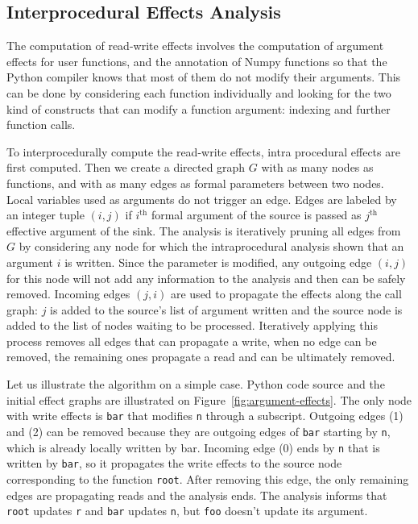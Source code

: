 \documentclass[10pt, preprint]{sigplanconf}
\begin{document}
\subsection{Interprocedural Effects Analysis}
\label{sec:effects}

The computation of read-write effects involves the computation of argument
effects for user functions, and the annotation of Numpy functions
so that the Python compiler knows that most of them do not modify their
arguments. This can be done by considering each function individually and
looking for the two kind of constructs that can modify a function argument:
indexing and further function calls.

To interprocedurally compute the read-write effects, intra procedural effects
are first computed. Then we create a directed graph $G$ with as many nodes as
functions, and with as many edges as formal parameters between two nodes. Local
variables used as arguments do not trigger an edge.
Edges are labeled by an integer tuple $(i, j)$ if $i^\text{th}$ formal
argument of the source is passed as $j^\text{th}$ effective argument of the
sink. The analysis is iteratively pruning all edges from $G$ by considering any
node for which the intraprocedural analysis shown that an argument $i$ is
written. Since the parameter is modified, any outgoing edge $(i, j)$ for this
node will not add any information to the analysis and then can be safely
removed. Incoming edges $(j, i)$ are used to propagate the effects along the
call graph: $j$ is added to the source's list of argument written and the source
node is added to the list of nodes waiting to be processed. Iteratively
applying this process removes all edges that can propagate a write, when no edge
can be removed, the remaining ones propagate a read and can be ultimately
removed.

Let us illustrate the algorithm on a simple case. Python code source and the
initial effect graphs are illustrated on Figure~\ref{fig:argument-effects}. The
only node with write effects is \texttt{bar} that modifies \texttt{n} through a
subscript. Outgoing edges (1) and (2) can be removed because they are
outgoing edges of \texttt{bar} starting by \texttt{n}, which is already locally written by bar. Incoming edge (0) ends
by \texttt{n} that is written by \texttt{bar}, so it propagates the write
effects to the source node corresponding to the function \texttt{root}. After
removing this edge, the only remaining edges are propagating reads and the
analysis ends. The analysis informs that \texttt{root} updates \texttt{r}
and \texttt{bar} updates \texttt{n}, but \texttt{foo} doesn't update its
argument.
\end{document}
